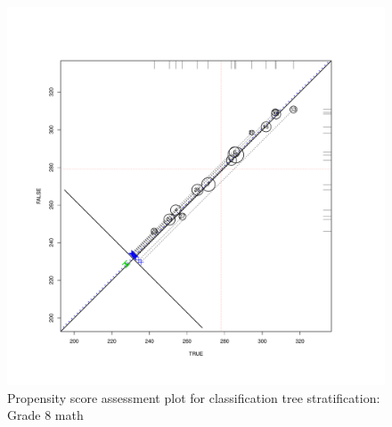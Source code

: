 \clearpage
\begin{figure}
\begin{center}
\includegraphics[height=.4\textheight,width=.4\textheight]{../Figures2009/g8math-circpsa-tree.pdf}
\caption{Propensity score assessment plot for classification tree stratification: Grade 8 math}
\end{center}
\end{figure}



